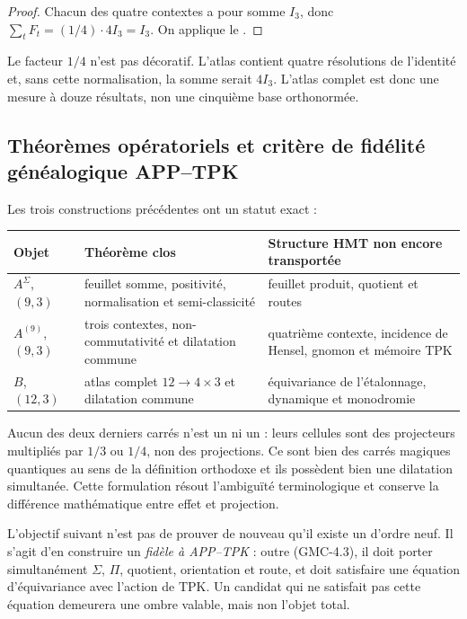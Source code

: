 \begin{proof}
Chacun des quatre contextes a pour somme $I_3$, donc
$\sum_tF_t=(1/4)\cdot4I_3=I_3$. On applique le
.
\end{proof}

Le facteur $1/4$ n'est pas décoratif. L'atlas contient quatre résolutions de
l'identité et, sans cette normalisation, la somme serait $4I_3$. L'atlas complet
est donc une mesure à douze résultats, non une cinquième base
orthonormée.

\subsection{Théorèmes opératoriels et critère de fidélité généalogique APP--TPK}

Les trois constructions précédentes ont un statut exact :

\begin{center}
\begin{tabularx}{.96\textwidth}{@{}L{.20\textwidth}L{.21\textwidth}Y@{}}
\toprule
Objet & Théorème clos & Structure HMT non encore transportée\\
\midrule
$A^\Sigma$, $(9,3)$ & feuillet somme, positivité, normalisation et
semi-classicité & feuillet produit, quotient et routes\\
$A^{(9)}$, $(9,3)$ & trois contextes, non-commutativité et dilatation commune &
quatrième contexte, incidence de Hensel, gnomon et mémoire TPK\\
$B$, $(12,3)$ & atlas complet $12\to4\times3$ et dilatation commune &
équivariance de l'étalonnage, dynamique et monodromie\\
\bottomrule
\end{tabularx}
\end{center}

Aucun des deux derniers carrés n'est un \QLS ni un \QPM : leurs cellules sont
des projecteurs multipliés par $1/3$ ou $1/4$, non des projections. Ce sont bien des carrés
magiques quantiques au sens de la définition orthodoxe et ils possèdent bien une dilatation
simultanée. Cette formulation résout l'ambiguïté terminologique et conserve
la différence mathématique entre effet et projection.

\begin{workbox}
L'objectif suivant n'est pas de prouver de nouveau qu'il existe un \QMS d'ordre
neuf. Il s'agit d'en construire un \emph{fidèle à APP--TPK} : outre \textup{(GMC-4.3)}, il doit
porter simultanément $\Sigma$, $\Pi$, quotient, orientation et route, et doit
satisfaire une équation d'équivariance avec l'action de TPK. Un candidat
qui ne satisfait pas cette équation demeurera une ombre valable, mais non l'objet
total.
\end{workbox}


